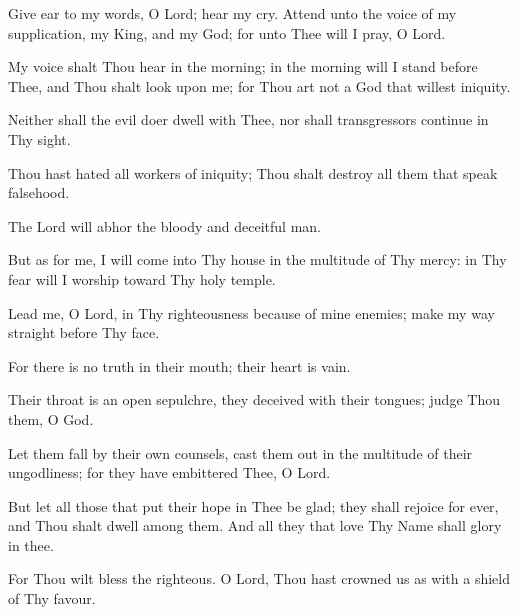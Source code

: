 Give ear to my words, O Lord; hear my cry. Attend unto the voice of my supplication, my King, and my God; for unto Thee will I pray, O Lord.

My voice shalt Thou hear in the morning; in the morning will I stand before Thee, and Thou shalt look upon me; for Thou art not a God that willest iniquity.

Neither shall the evil doer dwell with Thee, nor shall transgressors continue in Thy sight.

Thou hast hated all workers of iniquity; Thou shalt destroy all them that speak falsehood.

The Lord will abhor the bloody and deceitful man.

But as for me, I will come into Thy house in the multitude of Thy mercy: in Thy fear will I worship toward Thy holy temple.

Lead me, O Lord, in Thy righteousness because of mine enemies; make my way straight before Thy face.

For there is no truth in their mouth; their heart is vain.

Their throat is an open sepulchre, they deceived with their tongues; judge Thou them, O God.

Let them fall by their own counsels, cast them out in the multitude of their ungodliness; for they have embittered Thee, O Lord.

But let all those that put their hope in Thee be glad; they shall rejoice for ever, and Thou shalt dwell among them. And all they that love Thy Name shall glory in thee.

For Thou wilt bless the righteous. O Lord, Thou hast crowned us as with a shield of Thy favour.
